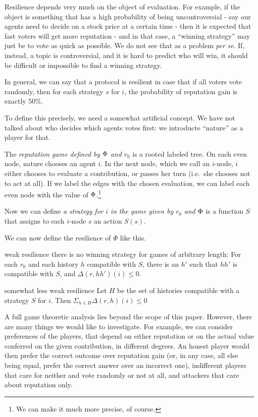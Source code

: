 \documentclass{article}
\begin{document}
Resilience depends very much on the object of evaluation. For example, if the object is something that has a high probability of being uncontroversial - say our agents need to decide on a stock price at a certain time - then it is expected that fast voters will get more reputation - and in that case, a ``winning strategy'' may just be to vote as quick as possible. We do not see that as a problem {\em per se}.
If, instead, a topic is controversial, and it is hard to predict who will win, it should be difficult or impossible to find a winning strategy. 

In general, we can say that a protocol is resilient in case that if all voters vote randomly, then for each strategy $s$ for $i$, the probability of reputation gain is exactly $50\%$.

To define this precisely, we need a somewhat artificial concept. We have not talked about who decides which agents votes first: we introducte ``nature'' as a player for that.

The {\em reputation game defined by $\Phi$ and $r_0$} is a rooted labeled tree. On each even node, nature chooses an agent $i$. In the next node, which we call an $i$-node, $i$ either chooses to evaluate a contribution, or passes her turn (i.e.\ she chooses not to act at all). 
If we label the edges with the chosen evaluation, we can label each even node with the value of $\Phi$.\footnote{We can make it much more precise, of course.}

Now we can define {\em a strategy for $i$ in the game given by $r_0$ and $\Phi$} is a function $S$ that assigns to each $i$-node $s$ an action $S(s)$.

We can now define the resilience of $\Phi$ like this. 

\begin{condition}{weak resilience} 
there is no winning strategy for games of arbitrary length: For each $r_0$ and each history $h$ compatible with $S$, there is an $h'$ such that $hh'$ is compatible with $S$, and $\Delta(r, hh')(i) \leq 0$.
\end{condition}
\begin{condition}{somewhat less weak resilience} 
Let $H$ be the set of histories compatible with a strategy $S$ for $i$. Then $\Sigma_{h\in H} \Delta(r, h)(i) \leq 0$
\end{condition}
A full game theoretic analysis lies beyond the scope of this paper. However, there are many things we would like to investigate. For example, we can consider preferences of the players, that depend on either reputation or on the actual value conferred on the given contribution, in different degrees. An honest player would then prefer the correct outcome over reputation gain (or, in any case, all else being equal, prefer the correct answer over an incorrect one), indifferent players that care for neither and vote randomly or not at all, and attackers that care about reputation only. 
\end{document}
